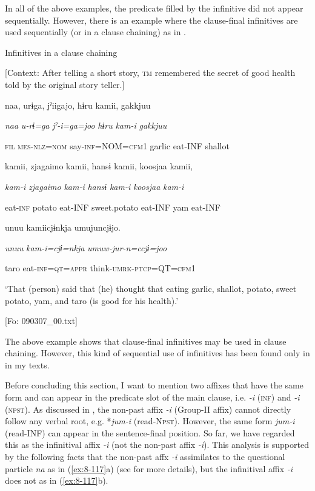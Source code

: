 In all of the above examples, the predicate filled by the infinitive did not appear sequentially. However, there is an example where the clause-final infinitives are used sequentially (or in a clause chaining) as in .

\ea\label{ex:8-116}
  Infinitives in a clause chaining

  [Context: After telling a short story, \textsc{tm} remembered the secret of good health told by the original story teller.]

  {\TM}
\glll  naa,  urɨga,  jˀiigajo,  hɨru  kamii,  gakkjuu

    \textit{naa}  \textit{u-rɨ=ga}  \textit{jˀ-i=ga=joo}  \textit{hɨru}  \textit{kam-i}  \textit{gakkjuu}

    \textsc{fil}  \textsc{mes}-\textsc{nlz}=\textsc{nom}  say-\textsc{inf}=NOM=\textsc{cfm1}  garlic  eat-INF  shallot

    kamii,  {\textbar}zjagaimo{\textbar}  kamii,  hansɨ  kamii,  koosjaa  kamii,

    \textit{kam-i}  \textit{zjagaimo}  \textit{kam-i}  \textit{hansɨ}  \textit{kam-i}  \textit{koosjaa}  \textit{kam-i}

    eat-\textsc{inf}  potato  eat-INF  sweet.potato  eat-INF  yam  eat-INF

    unuu  kamiicjɨnkja  umujuncjɨjo.

    \textit{unuu}  \textit{kam-i=cjɨ=nkja}  \textit{umuw-jur-n=ccjɨ=joo}

    taro  eat-\textsc{inf}=\textsc{qt}=\textsc{appr}  think-\textsc{umrk}-\textsc{ptcp}=QT=\textsc{cfm1}

    ‘That (person) said that (he) thought that eating garlic, shallot, potato, sweet potato, yam, and taro (is good for his health).’

    [Fo: 090307\_00.txt]
\z

The above example shows that clause-final infinitives may be used in clause chaining. However, this kind of sequential use of infinitives has been found only in  in my texts.

Before concluding this section, I want to mention two affixes that have the same form and can appear in the predicate slot of the main clause, i.e. \textit{{}-i} (\textsc{inf}) and \textit{{}-i} (\textsc{npst}). As discussed in , the non-past affix \textit{{}-i} (Group-II affix) cannot directly follow any verbal root, e.g. *\textit{jum-i} (read-N\textsc{pst}). However, the same form \textit{jum-i} (read-INF) can appear in the sentence-final position. So far, we have regarded this as the infinitival affix \textit{{}-i} (not the non-past affix \textit{{}-i}). This analysis is supported by the following facts that the non-past affx \textit{{}-i} assimilates to the questional particle \textit{na} as in (\ref{ex:8-117}a) (see  for more details), but the infinitival affix \textit{{}-i} does not as in (\ref{ex:8-117}b).

